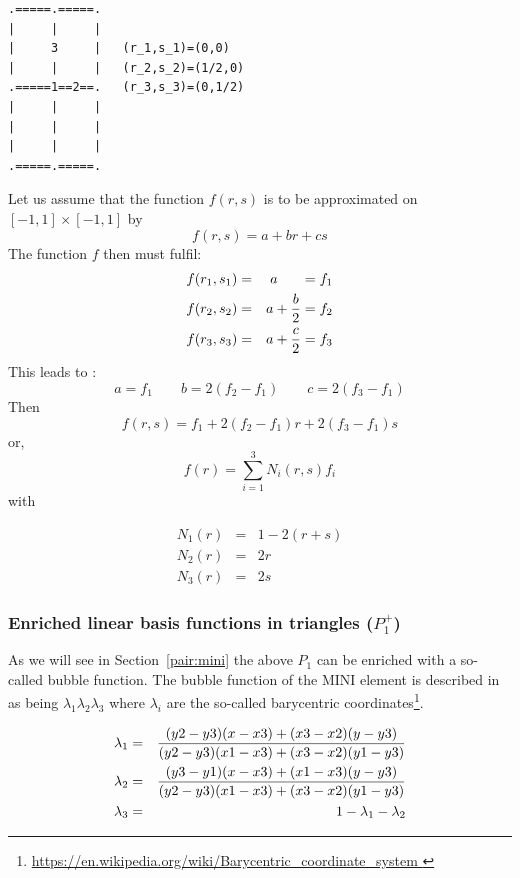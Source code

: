 \begin{verbatim}
.=====.=====.
|     |     |
|     3     |   (r_1,s_1)=(0,0)
|     |     |   (r_2,s_2)=(1/2,0)
.=====1==2==.   (r_3,s_3)=(0,1/2)
|     |     |
|     |     |
|     |     |
.=====.=====.
\end{verbatim}

Let us assume that the function $f(r,s)$ is to be approximated on $[-1,1]\times[-1,1]$ by 
\[
f(r,s)=a+br+cs
\]
The function $f$ then must fulfil:
\begin{eqnarray}
f(r_1,s_1)&=&a \;\;\;\;\;\; =f_1    \nonumber\\
f(r_2,s_2)&=&a+\frac{b}{2}=f_2 \nonumber\\
f(r_3,s_3)&=&a+\frac{c}{2}=f_3
\end{eqnarray}
This leads to : 
\[
a=f_1
\quad
\quad
b=2(f_2-f_1)
\quad
\quad
c=2(f_3-f_1)
\]
Then
\[
f(r,s)=f_1 + 2(f_2-f_1) r + 2(f_3-f_1) s
\]
or, 
\[
f(r) = \sum_{i=1}^3 N_i(r,s) f_i
\]
with
\begin{mdframed}[backgroundcolor=blue!5]
\begin{eqnarray}
N_1(r) &=& 1-2(r+s)  \nonumber\\
N_2(r) &=& 2r   \nonumber\\
N_3(r) &=& 2s
\end{eqnarray}
\end{mdframed}






\subsubsection{Enriched linear basis functions in triangles ($P_1^+$)}

As we will see in Section~\ref{pair:mini} the above $P_1$ can be enriched 
with a so-called bubble function.
The  bubble function of the MINI element 
is described in \cite{arbf84} as being $\lambda_1\lambda_2\lambda_3$
where $\lambda_i$ are the so-called barycentric 
coordinates\footnote{\url{https://en.wikipedia.org/wiki/Barycentric\_coordinate\_system }}.

\begin{eqnarray}
\lambda_1 &=& \frac{(y2-y3)(x-x3)+(x3-x2)(y-y3)}{(y2-y3)(x1-x3)+(x3-x2)(y1-y3)} \nonumber\\
\lambda_2 &=& \frac{(y3-y1)(x-x3)+(x1-x3)(y-y3)}{(y2-y3)(x1-x3)+(x3-x2)(y1-y3)} \nonumber\\
\lambda_3 &=& 1-\lambda_1-\lambda_2 \nonumber
\end{eqnarray}

